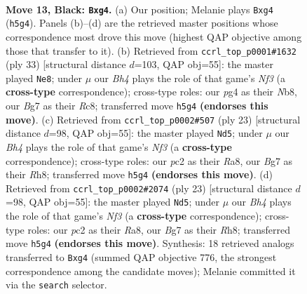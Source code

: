 \documentclass[11pt]{article}
\begin{document}
\clearpage

\begin{figure}[p]\centering
\begin{subfigure}{0.46\textwidth}\centering
\resizebox{\linewidth}{!}{%
\newchessgame
\chessboard[
  setfen={rn1r1k2/pp3pbp/2p2np1/1P2p2b/P3P1PP/2N2N2/2P1BP2/R1B2RK1 b - - 0 13},
  showmover=false,
  pgfstyle=straightmove, color=movearrow, markmove={h5-g4}
]}
\caption{}
\end{subfigure}\hfill
\begin{subfigure}{0.46\textwidth}\centering
\resizebox{\linewidth}{!}{%
\newchessgame
\chessboard[
  setfen={rnr2k2/3pbppp/1pbBpn2/1Np3P1/2P5/P3P3/1P1N1P1P/R3KBR1 b Q - 0 17},
  showmover=false,
  pgfstyle=straightmove, color=movearrow, markmove={f6-e8}
]}
\caption{}
\end{subfigure}
\\[4pt]
\begin{subfigure}{0.46\textwidth}\centering
\resizebox{\linewidth}{!}{%
\newchessgame
\chessboard[
  setfen={r4k1r/pbpnbppp/1p2pn2/1N2P1B1/3P4/P4N2/1P3PPP/R3KB1R b KQ - 0 12},
  showmover=false,
  pgfstyle=straightmove, color=movearrow, markmove={f6-d5}
]}
\caption{}
\end{subfigure}\hfill
\begin{subfigure}{0.46\textwidth}\centering
\resizebox{\linewidth}{!}{%
\newchessgame
\chessboard[
  setfen={r4k1r/pbpnbppp/1p2pn2/1N2P1B1/3P4/P4N2/1P3PPP/R3KB1R b KQ - 0 12},
  showmover=false,
  pgfstyle=straightmove, color=movearrow, markmove={f6-d5}
]}
\caption{}
\end{subfigure}
\caption{\textbf{Move 13, Black: \texttt{Bxg4}.} (a) Our position; Melanie plays \texttt{Bxg4} (\texttt{h5g4}). Panels (b)--(d) are the retrieved master positions whose correspondence most drove this move (highest QAP objective among those that transfer to it). (b) Retrieved from \texttt{ccrl\_top\_p0001\#1632} (ply 33) [structural distance $d$=103, QAP obj=55]: the master played \texttt{Ne8}; under $\mu$ our \emph{Bh4} plays the role of that game's \emph{Nf3} (a \textbf{cross-type} correspondence); cross-type roles: our \emph{p}g4 as their \emph{N}b8, our \emph{B}g7 as their \emph{R}c8; transferred move \texttt{h5g4} \textbf{(endorses this move)}. (c) Retrieved from \texttt{ccrl\_top\_p0002\#507} (ply 23) [structural distance $d$=98, QAP obj=55]: the master played \texttt{Nd5}; under $\mu$ our \emph{Bh4} plays the role of that game's \emph{Nf3} (a \textbf{cross-type} correspondence); cross-type roles: our \emph{p}c2 as their \emph{R}a8, our \emph{B}g7 as their \emph{R}h8; transferred move \texttt{h5g4} \textbf{(endorses this move)}. (d) Retrieved from \texttt{ccrl\_top\_p0002\#2074} (ply 23) [structural distance $d$=98, QAP obj=55]: the master played \texttt{Nd5}; under $\mu$ our \emph{Bh4} plays the role of that game's \emph{Nf3} (a \textbf{cross-type} correspondence); cross-type roles: our \emph{p}c2 as their \emph{R}a8, our \emph{B}g7 as their \emph{R}h8; transferred move \texttt{h5g4} \textbf{(endorses this move)}. Synthesis: 18 retrieved analogs transferred to \texttt{Bxg4} (summed QAP objective 776, the strongest correspondence among the candidate moves); Melanie committed it via the \texttt{search} selector.}

\end{figure}
\end{document}
